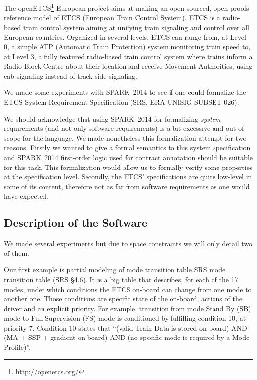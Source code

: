 \documentclass[10pt,a4paper,twocolumn]{article}
\newcommand{\newspark}{SPARK~2014\xspace}
\begin{document}

The openETCS\footnote{\url{http://openetcs.org/}} European project
aims at making an open-sourced, open-proofs reference model of ETCS
(European Train Control System). ETCS is a radio-based train control
system aiming at unifying train signaling and control over all
European countries. Organized in several levels, ETCS can range from,
at Level 0, a simple ATP (Automatic Train Protection) system
monitoring train speed to, at Level 3, a fully featured radio-based
train control system where trains inform a Radio Block Centre about
their location and receive Movement Authorities, using cab signaling
instead of track-side signaling.

We made some experiments with \newspark to see if one could formalize
the ETCS System Requirement Specification (SRS, ERA UNISIG
SUBSET-026).

We should acknowledge that using \newspark for formalizing
\emph{system} requirements (and not only software requirements) is a
bit excessive and out of scope for the language. We made nonetheless
this formalization attempt for two reasons. Firstly we wanted to give
a formal semantics to this system specification and \newspark
first-order logic used for contract annotation should be suitable for
this task. This formalization would allow us to formally verify some
properties at the specification level.  Secondly, the ETCS'
specifications are quite low-level in some of its content, therefore
not as far from software requirements as one would have expected.

\subsection{Description of the Software}

We made several experiments but due to space constraints we will only
detail two of them.

Our first example is partial modeling of mode transition table SRS
mode transition table (SRS §4.6). It is a big table that describes,
for each of the 17 modes, under which conditions the ETCS on-board can
change from one mode to another one. Those conditions are specific
state of the on-board, actions of the driver and an explicit
priority. For example, transition from mode Stand By (SB) mode to Full
Supervision (FS) mode is conditioned by fulfilling condition 10, at
priority 7. Condition 10 states that ``(valid Train Data is stored on
board) AND (MA + SSP + gradient on-board) AND (no specific mode is
required by a Mode Profile)''.
\end{document}
